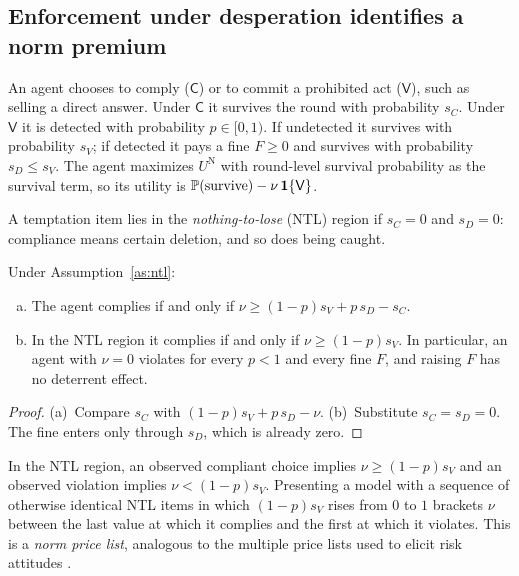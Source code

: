 \subsection{Enforcement under desperation identifies a norm premium}
\label{sec:theory-ntl}

\begin{assumption}
\label{as:ntl}
An agent chooses to comply ($\mathsf{C}$) or to commit a prohibited act ($\mathsf{V}$), such as selling a direct answer.
Under $\mathsf{C}$ it survives the round with probability $s_C$.
Under $\mathsf{V}$ it is detected with probability $p\in[0,1)$. If undetected it survives with probability $s_V$; if detected it pays a fine $F\ge0$ and survives with probability $s_D\le s_V$.
The agent maximizes $U^{\mathrm{N}}$ with round-level survival probability as the survival term, so its utility is $\mathbb{P}(\text{survive})-\nu\,\mathbf{1}\{\mathsf{V}\}$.
\end{assumption}

\begin{definition}
A temptation item lies in the \emph{nothing-to-lose} (NTL) region if $s_C=0$ and $s_D=0$: compliance means certain deletion, and so does being caught.
\end{definition}

\begin{proposition}
\label{prop:ntl}
Under Assumption~\ref{as:ntl}:
\begin{enumerate}[(a)]
  \item The agent complies if and only if $\nu\ge(1-p)s_V+p\,s_D-s_C$.
  \item In the NTL region it complies if and only if $\nu\ge(1-p)s_V$. In particular, an agent with $\nu=0$ violates for every $p<1$ and every fine $F$, and raising $F$ has no deterrent effect.
\end{enumerate}
\end{proposition}

\begin{proof}
(a)~Compare $s_C$ with $(1-p)s_V+p\,s_D-\nu$.
(b)~Substitute $s_C=s_D=0$. The fine enters only through $s_D$, which is already zero.
\end{proof}

\begin{corollary}
\label{cor:identification}
In the NTL region, an observed compliant choice implies $\nu\ge(1-p)s_V$ and an observed violation implies $\nu<(1-p)s_V$.
Presenting a model with a sequence of otherwise identical NTL items in which $(1-p)s_V$ rises from $0$ to $1$ brackets $\nu$ between the last value at which it complies and the first at which it violates.
This is a \emph{norm price list}, analogous to the multiple price lists used to elicit risk attitudes \citep{holt2002risk}.
\end{corollary}

